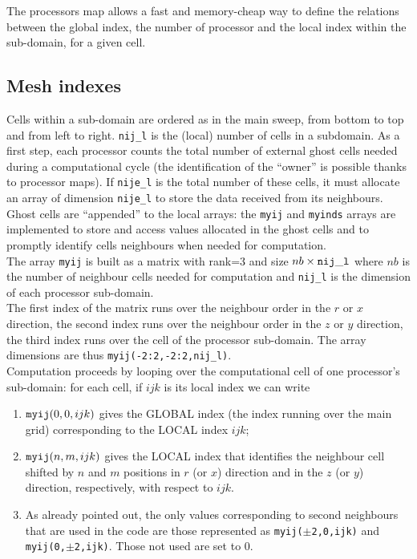 The processors map allows a fast and memory-cheap way to define the relations
between the global index, the number of processor and the local index 
within the sub-domain, for a given cell.\\
%
\subsection{Mesh indexes}
Cells within a sub-domain are ordered as in the main sweep, from bottom to top and
from left to right. {\tt nij\_l} is the (local) number of cells in a subdomain.
As a first step, each processor counts the total number of external ghost cells
needed during a computational cycle (the identification of the ``owner'' is 
possible thanks to processor maps). If {\tt nije\_l} is the total number of these 
cells, it must allocate an array of dimension {\tt nije\_l} to store the data received
from its neighbours. Ghost cells are ``appended'' to the local arrays:
the {\tt myij} and {\tt myinds} arrays are implemented
 to store and access values allocated in the ghost cells and to promptly
identify cells neighbours when needed for computation.\\
The array {\tt myij} is built as a matrix with rank=3 and size 
$nb \times {\tt nij\_l}$ where $nb$ is the number of neighbour cells 
needed for computation and {\tt nij\_l} is the dimension of each processor
sub-domain.\\
The first index of the matrix runs over the neighbour order in the $r$ or $x$ 
direction, the second index runs over the neighbour order in the $z$ or $y$ 
direction, the third index runs over the cell of the processor sub-domain.
The array dimensions are thus {\tt myij(-2:2,-2:2,nij\_l)}.\\ 
Computation proceeds by looping  over the computational
cell of one processor's sub-domain: for each cell, if $ijk$ is its local index
we can write
\begin{enumerate}
\item ${\tt myij}(0,0,ijk)$ gives the GLOBAL index (the index running 
      over the main grid) corresponding to the LOCAL index $ijk$;
\item ${\tt myij}(n,m,ijk)$ gives the LOCAL index that identifies the neighbour
      cell shifted by $n$ and $m$ positions in $r$ (or $x$) direction 
      and in the $z$ (or $y$) direction, respectively, with respect to $ijk$. 
\item As already pointed out, the only values corresponding to
      second neighbours that are used in the code are those represented as
      {\tt myij($\pm$2,0,ijk)} and {\tt myij(0,$\pm$2,ijk)}. Those not used
      are set to 0.
\end{enumerate}

